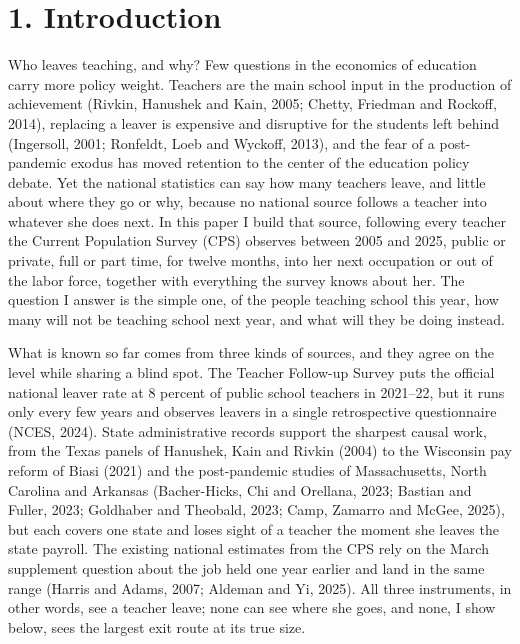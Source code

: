 \documentclass[11pt,a4paper]{article}
\begin{document}
\clearpage
\section*{1. Introduction}

Who leaves teaching, and why? Few questions in the economics of education
carry more policy weight. Teachers are the main school input in the
production of achievement (Rivkin, Hanushek and Kain, 2005; Chetty,
Friedman and Rockoff, 2014), replacing a leaver is expensive and
disruptive for the students left behind (Ingersoll, 2001; Ronfeldt, Loeb
and Wyckoff, 2013), and the fear of a post-pandemic exodus has moved
retention to the center of the education policy debate. Yet the national
statistics can say how many teachers leave, and little about where they
go or why, because no national source follows a teacher into whatever
she does next. In this paper I build that source, following every
teacher the Current Population Survey (CPS) observes between 2005 and
2025, public or private, full or part time, for twelve months, into her
next occupation or out of the labor force, together with everything the
survey knows about her. The question I answer is the simple one, of the
people teaching school this year, how many will not be teaching school
next year, and what will they be doing instead.

What is known so far comes from three kinds of sources, and they agree
on the level while sharing a blind spot. The Teacher Follow-up Survey
puts the official national leaver rate at 8 percent of public school
teachers in 2021--22, but it runs only every few years and observes
leavers in a single retrospective questionnaire (NCES, 2024). State
administrative records support the sharpest causal work, from the Texas
panels of Hanushek, Kain and Rivkin (2004) to the Wisconsin pay reform
of Biasi (2021) and the post-pandemic studies of Massachusetts, North
Carolina and Arkansas (Bacher-Hicks, Chi and Orellana, 2023; Bastian and
Fuller, 2023; Goldhaber and Theobald, 2023; Camp, Zamarro and McGee,
2025), but each covers one state and loses sight of a teacher the moment
she leaves the state payroll. The existing national estimates from the
CPS rely on the March supplement question about the job held one year
earlier and land in the same range (Harris and Adams, 2007; Aldeman and
Yi, 2025). All three instruments, in other words, see a teacher leave;
none can see where she goes, and none, I show below, sees the largest
exit route at its true size.
\end{document}
